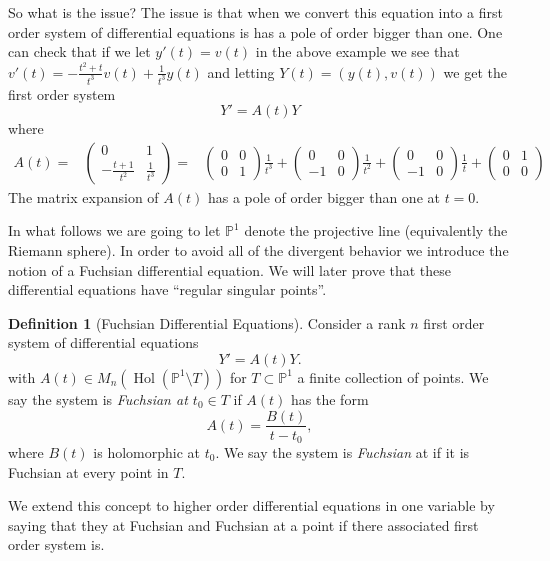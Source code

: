 \documentclass[12pt]{book}
\numberwithin{equation}{section}
\theoremstyle{definition}
\newtheorem{definition}[theorem]{Definition}
\theoremstyle{remark}
\newcommand{\PP}{\mathbb{P}}
\newcommand{\hol}{\operatorname{Hol}}
\begin{document}
So what is the issue? 
The issue is that when we convert this equation into a first order system of differential equations is has a pole of order bigger than one. 
One can check that if we let $y'(t)=v(t)$ in the above example we see that  $v'(t) = -\frac{t^2+t}{t^3}v(t)+\frac{1}{t^3}y(t)$ and letting $Y(t) = (y(t),v(t))$ we get the first order system 
 $$ Y' =A(t) Y $$
where 
\begin{align*}
 A(t) =& 
\begin{pmatrix}
0 & 1 \\
-\frac{t+1}{t^2} & \frac{1}{t^3}
\end{pmatrix} 
=&
\begin{pmatrix}
0 & 0 \\
0 & 1
\end{pmatrix} \frac{1}{t^3}
+\begin{pmatrix}
0 & 0 \\
-1 & 0 
\end{pmatrix}\frac{1}{t^2}
+
\begin{pmatrix}
0 & 0 \\
-1 & 0 
\end{pmatrix}\frac{1}{t}
+
\begin{pmatrix}
0 & 1 \\
0 & 0  
\end{pmatrix}
\end{align*}
The matrix expansion of $A(t)$ has a pole of order bigger than one at $t=0$. 

In what follows we are going to let $\PP^1$ denote the projective line (equivalently the Riemann sphere). 
In order to avoid all of the divergent behavior we introduce the notion of a Fuchsian differential equation. 
We will later prove that these differential equations have ``regular singular points''.
\begin{definition}[Fuchsian Differential Equations]
Consider a rank $n$ first order system of differential equations 
\begin{equation}\label{E:first-order-system}
  Y' = A(t) Y. 
 \end{equation}
with $A(t) \in M_n(\hol(\PP^1\setminus T))$ for $T\subset \PP^1$ a finite collection of points. 
We say the system  is \emph{Fuchsian at $t_0 \in T$} if $A(t)$ has the form
		 $$ A(t) = \frac{B(t)}{t-t_0},$$
where $B(t)$ is  holomorphic at $t_0$. 
We say the system is \emph{Fuchsian} at if it is Fuchsian at every point in $T$. 
\end{definition}
We extend this concept to higher order differential equations in one variable by saying that they at Fuchsian and Fuchsian at a point if there associated first order system is. 
\end{document}
